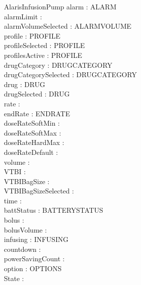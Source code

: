\begin{schema}{AlarisInfusionPump}
	alarm : ALARM\\
	alarmLimit : \nat\\
	alarmVolumeSelected : ALARMVOLUME\\
	profile : PROFILE\\
	profileSelected : PROFILE\\
	profilesActive : \power PROFILE\\
	drugCategory : DRUGCATEGORY\\
	drugCategorySelected : DRUGCATEGORY\\
	drug : DRUG\\
	drugSelected : DRUG\\
	rate : \nat\\
	endRate : ENDRATE\\
	doseRateSoftMin : \nat\\
	doseRateSoftMax : \nat\\
	doseRateHardMax : \nat\\
	doseRateDefault : \nat\\
	volume : \nat\\
	VTBI : \nat\\
	VTBIBagSize : \nat\\
	VTBIBagSizeSelected : \nat\\
	time : \nat\\
	battStatus : BATTERYSTATUS\\
	bolus : \nat\\
	bolusVolume : \nat\\
	infusing : INFUSING\\
	\pagebreak
	countdown : \nat\\
	powerSavingCount : \nat\\
	option : OPTIONS\\
	State : \nat\\
\end{schema}
\vfill
